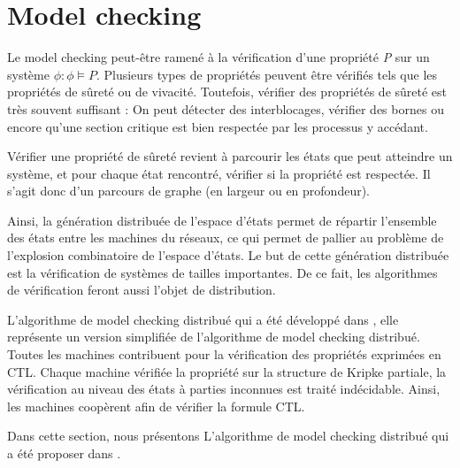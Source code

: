 \section{Model checking}
Le model checking peut-être ramené à la vérification d'une propriété \emph{P} sur un système $\phi : \phi \models P$. Plusieurs types de propriétés peuvent être vérifiés tels que les propriétés de sûreté ou de vivacité. Toutefois, vérifier des propriétés de sûreté est très souvent suffisant : On peut détecter des interblocages, vérifier des bornes ou encore qu'une section critique est bien respectée par les processus y accédant. 


Vérifier une propriété de sûreté revient à parcourir les états que peut atteindre un système, et pour chaque état rencontré, vérifier si la propriété est respectée. Il s'agit donc d'un parcours de graphe (en largeur ou en profondeur).

Ainsi, la génération distribuée de l'espace d'états permet de répartir l'ensemble des états entre les machines du réseaux, ce qui permet de pallier au problème de l'explosion combinatoire de l'espace d'états. Le but de cette génération distribuée est la vérification de systèmes de tailles importantes. De ce fait, les algorithmes de vérification feront aussi l'objet de distribution. 

L'algorithme de model checking distribué qui a été développé dans \citep{depriester2011bouneb}, elle représente un version simplifiée de l'algorithme de model checking distribué. Toutes les machines contribuent pour la vérification des propriétés exprimées en CTL. Chaque machine vérifiée la propriété sur la structure de Kripke partiale, la vérification au niveau des états à parties inconnues est traité indécidable. Ainsi, les machines coopèrent afin de vérifier la formule CTL. 

Dans cette section, nous présentons L'algorithme de model checking distribué qui a été proposer dans \citep{depriester2011bouneb}.

